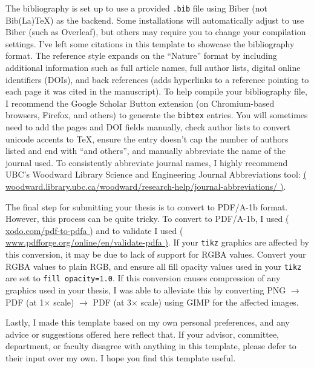 \documentclass[12pt,letterpaper,oneside,titlepage,final]{dalthesis}
\numberwithin{equation}{section}
\begin{document}
The bibliography is set up to use a provided \texttt{.bib} file using Biber (not Bib(La)TeX) as the backend. Some installations will automatically adjust to use Biber (such as Overleaf), but others may require you to change your compilation settings. I've left some citations in this template to showcase the bibliography format. The reference style expands on the ``Nature'' format by including additional information such as full article names, full author lists, digital online identifiers (DOIs), and back references (adds hyperlinks to a reference pointing to each page it was cited in the manuscript). To help compile your bibliography file, I recommend the Google Scholar Button extension (on Chromium-based browsers, Firefox, and others) to generate the \texttt{bibtex} entries. You will sometimes need to add the pages and DOI fields manually, check author lists to convert unicode accents to \TeX, ensure the entry doesn't cap the number of authors listed and end with ``and others'', and manually abbreviate the name of the journal used. To consistently abbreviate journal names, I highly recommend UBC's Woodward Library Science and Engineering Journal Abbreviations tool: \href{https://woodward.library.ubc.ca/woodward/research-help/journal-abbreviations/}{( woodward.library.ubc.ca/woodward/research-help/journal-abbreviations/ )}.

The final step for submitting your thesis is to convert to PDF/A-1b format. However, this process can be quite tricky. To convert to PDF/A-1b, I used \href{https://xodo.com/pdf-to-pdfa}{( xodo.com/pdf-to-pdfa )} and to validate I used \href{https://www.pdfforge.org/online/en/validate-pdfa}{( www.pdfforge.org/online/en/validate-pdfa )}. If your \texttt{tikz} graphics are affected by this conversion, it may be due to lack of support for RGBA values. Convert your RGBA values to plain RGB, and ensure all fill opacity values used in your \texttt{tikz} are set to \texttt{fill opacity=1.0}. If this conversion causes compression of any graphics used in your thesis, I was able to alleviate this by converting PNG $\rightarrow$ PDF (at 1$\times$ scale) $\rightarrow$ PDF (at 3$\times$ scale) using GIMP for the affected images.

Lastly, I made this template based on my own personal preferences, and any advice or suggestions offered here reflect that. If your advisor, committee, department, or faculty disagree with anything in this template, please defer to their input over my own. I hope you find this template useful.


\clearpage
\end{document}
